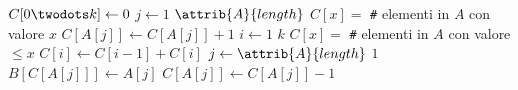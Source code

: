 \begin{codebox}
\li $C[0\twodots k] \leftarrow 0$
\li \For $j \gets 1$ \To $\attrib{A}{length}$
\zi \Do
		\Comment $C[x] =$ \verb|#| elementi in $A$ con valore $x$
\li		$C[A[j]] \gets C[A[j]] + 1$ 
    \End
\li \For $i \gets 1$ \To $k$
\zi \Do
        \Comment $C[x] =$ \verb|#| elementi in $A$ con valore $\leq x$
\li     $C[i] \gets C[i-1] + C[i]$ 
    \End
\li \For $j \gets \attrib{A}{length}$ \Downto $1$
\li \Do
        $B[C[A[j]]] \gets A[j]$
\li     $C[A[j]] \gets C[A[j]] - 1$
    \End
\end{codebox}
